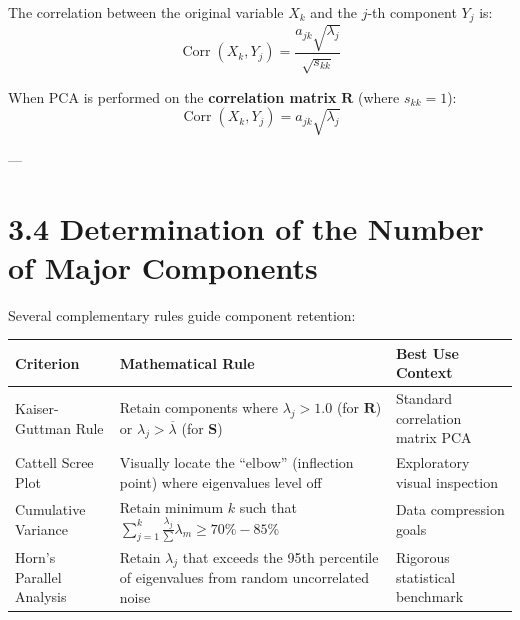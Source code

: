 \documentclass[
]{article}
\begin{document}
The correlation between the original variable \(X_{k}\) and the \(j\)-th
component \(Y_{j}\) is:
\[\operatorname{Corr}(X_{k},Y_{j}) = \frac{a_{jk}\sqrt{\lambda_{j}}}{\sqrt{s_{kk}}}\]

When PCA is performed on the \textbf{correlation matrix} \(\mathbf{R}\)
(where \(s_{kk} = 1\)):
\[\operatorname{Corr}(X_{k},Y_{j}) = a_{jk}\sqrt{\lambda_{j}}\]

---

\textbf{ }

\section{3.4 Determination of the Number of Major Components}

Several complementary rules guide component retention:

{\def\LTcaptype{none} %
\begin{longtable}[]{@{}
  >{\raggedright\arraybackslash}p{}
  >{\raggedright\arraybackslash}p{}
  >{\raggedright\arraybackslash}p{}@{}}
\toprule\noalign{}
\begin{minipage}[b]{\linewidth}\raggedright
\textbf{Criterion}
\end{minipage} & \begin{minipage}[b]{\linewidth}\raggedright
\textbf{Mathematical Rule}
\end{minipage} & \begin{minipage}[b]{\linewidth}\raggedright
\textbf{Best Use Context}
\end{minipage} \\
\midrule\noalign{}
\endhead
\bottomrule\noalign{}
\endlastfoot
Kaiser-Guttman Rule & Retain components where \(\lambda_{j} > 1.0\) (for
\(\mathbf{R}\)) or \(\lambda_{j} > \overline{\lambda}\) (for
\(\mathbf{S}\)) & Standard correlation matrix PCA \\
Cattell Scree Plot & Visually locate the ``elbow'' (inflection point)
where eigenvalues level off & Exploratory visual inspection \\
Cumulative Variance & Retain minimum \(k\) such that
\(\sum_{j = 1}^{k}\frac{\lambda_{j}}{\sum}\lambda_{m} \geq 70\% - 85\%\)
& Data compression goals \\
Horn's Parallel Analysis & Retain \(\lambda_{j}\) that exceeds the 95th
percentile of eigenvalues from random uncorrelated noise & Rigorous
statistical benchmark \\
\end{longtable}
}
\end{document}

